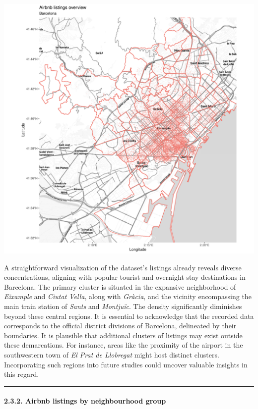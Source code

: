 \documentclass[
]{article}
\begin{document}
\begin{center}\includegraphics{Barcelona-AirBnB-Insights_files/figure-latex/plot1-1} \end{center}

A straightforward visualization of the dataset's listings already
reveals diverse concentrations, aligning with popular tourist and
overnight stay destinations in Barcelona. The primary cluster is
situated in the expansive neighborhood of \emph{Eixample} and
\emph{Ciutat Vella}, along with \emph{Gràcia}, and the vicinity
encompassing the main train station of \emph{Sants} and \emph{Montjuïc}.
The density significantly diminishes beyond these central regions. It is
essential to acknowledge that the recorded data corresponds to the
official district divisions of Barcelona, delineated by their
boundaries. It is plausible that additional clusters of listings may
exist outside these demarcations. For instance, areas like the proximity
of the airport in the southwestern town of \emph{El Prat de Llobregat}
might host distinct clusters. Incorporating such regions into future
studies could uncover valuable insights in this regard.

\begin{center}\rule{0.5\linewidth}{0.5pt}\end{center}

\hypertarget{airbnb-listings-by-neighbourhood-group}{%
\paragraph{2.3.2. Airbnb listings by neighbourhood
group}\label{airbnb-listings-by-neighbourhood-group}}
\end{document}
